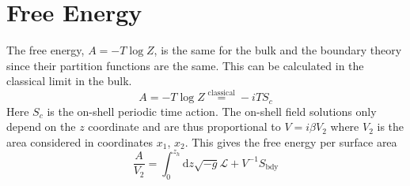 \documentclass[12pt]{report}
\renewcommand{\d}{\ensuremath{\mathrm{d}}}
\renewcommand{\L}{\ensuremath{\mathcal{L}}}
\renewcommand{\i}{\ensuremath{i}}
\begin{document}
\section{Free Energy}
The free energy, $A=-T\log{Z}$, is the same for the bulk and the boundary theory since their partition functions are the same. This can be calculated in the classical limit in the bulk.
\begin{equation}
 A=-T\log{Z}\stackrel{\mathrm{classical}}{=}-\i T S_c
\end{equation}
Here $S_c$ is the on-shell periodic time action. The on-shell field solutions only depend on the $z$ coordinate and are thus proportional to $V=\i\beta V_2$ where $V_2$ is the area considered in coordinates $x_1$, $x_2$. This gives the free energy per surface area
\begin{equation}
 \frac{A}{V_2}=\int_0^{z_h}\d z \sqrt{-g}\L+V^{-1}S_{\mathrm{bdy}}
\end{equation}
\end{document}
